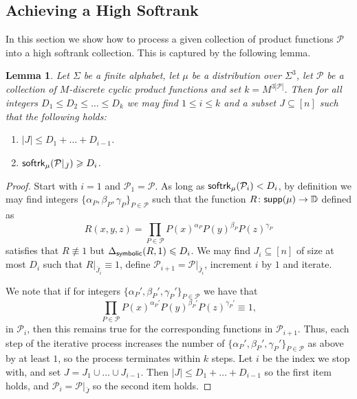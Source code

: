 \documentclass[11pt]{article}
\newtheorem{lemma}[thm]{Lemma}
\newcommand\card[1]{\left| {#1} \right|}
\renewcommand\geq{\geqslant}
\renewcommand\leq{\leqslant}
\begin{document}
    \subsection{Achieving a High Softrank}\label{sec:high_softrank}
    In this section we show how to process a given collection of product functions $\mathcal{P}$ into a high softrank collection. This is captured by the following lemma.
    \begin{lemma}\label{lem:softrank_gain}
        Let $\Sigma$ be a finite alphabet, let $\mu$ be a distribution over $\Sigma^3$, let $\mathcal{P}$ be a collection of $M$-discrete cyclic product functions and set $k = M^{3\card{\mathcal{P}}}$. Then for all integers $D_1\leq D_2\leq\ldots\leq D_k$ we may find $1\leq i\leq k$ and a subset $J\subseteq [n]$ such that the following holds:
        \begin{enumerate}
            \item $\card{J}\leq D_1+\ldots+D_{i-1}$.
            \item ${\sf softrk}_{\mu}(\mathcal{P}|_{\bar{J}})\geq D_{i}$.
        \end{enumerate}
    \end{lemma}
    \begin{proof}
        Start with $i=1$ and $\mathcal{P}_1 = \mathcal{P}$. As long as ${\sf softrk}_{\mu}(\mathcal{P}_i)<D_i$, by definition we may find integers $\{\alpha_P,\beta_{P},\gamma_{P}\}_{P\in\mathcal{P}}$ such that the function 
        $R\colon {\sf supp}(\mu)\to\mathbb{D}$ defined as
        \[
        R(x,y,z) = \prod\limits_{P\in\mathcal{P}}P(x)^{\alpha_P}P(y)^{\beta_P}P(z)^{\gamma_P}
        \] 
        satisfies that $R\not\equiv 1$ but $\Delta_{{\sf symbolic}}(R,1)\leq D_i$. We may find $J_i\subseteq [n]$ of size at most $D_i$ such that $R|_{\bar{J}_i}\equiv 1$, define $\mathcal{P}_{i+1} = \mathcal{P}|_{\bar{J}_i}$, increment $i$ by $1$ and iterate. 

        We note that if for integers $\{\alpha_P',\beta_{P}',\gamma_{P}'\}_{P\in\mathcal{P}}$ we have that
        \[
        \prod\limits_{P\in\mathcal{P}}P(x)^{\alpha_P'}P(y)^{\beta_P'}P(z)^{\gamma_P'}\equiv 1,
        \]
        in $\mathcal{P}_i$, then this remains true for the corresponding functions in $\mathcal{P}_{i+1}$. Thus, each step of the iterative process increases the number of $\{\alpha_P',\beta_{P}',\gamma_{P}'\}_{P\in\mathcal{P}}$ as above by at least $1$, so the process terminates within $k$ steps. Let $i$ be the index we stop with, and set $J = J_1\cup\ldots \cup J_{i-1}$. Then $\card{J}\leq D_1+\ldots+D_{i-1}$ so the first item holds, and $\mathcal{P}_i = \mathcal{P}|_{\bar{J}}$ so the second item holds.
    \end{proof}
\end{document}
